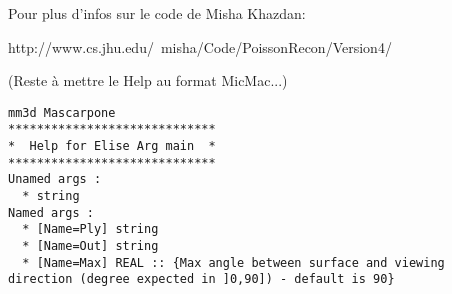 Pour plus d'infos sur le code de Misha Khazdan:

http://www.cs.jhu.edu/~misha/Code/PoissonRecon/Version4/
	
\vspace{\baselineskip}
(Reste à mettre le Help au format MicMac...)

\begin{verbatim} 
mm3d Mascarpone
*****************************
*  Help for Elise Arg main  *
*****************************
Unamed args :
  * string
Named args :
  * [Name=Ply] string
  * [Name=Out] string
  * [Name=Max] REAL :: {Max angle between surface and viewing direction (degree expected in ]0,90]) - default is 90}
\end{verbatim}

